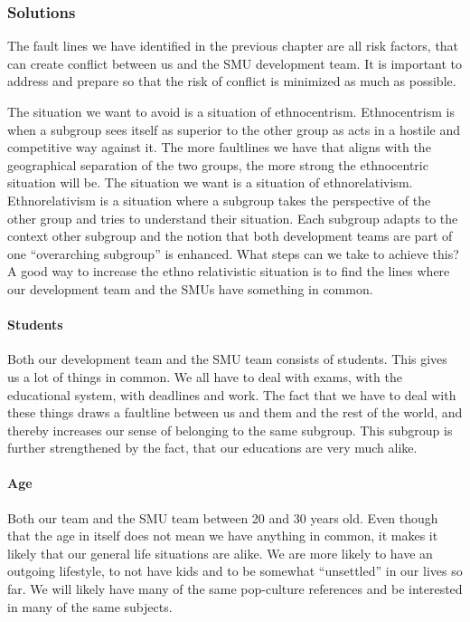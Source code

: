 \documentclass[a4paper,11pt,report]{article}
\begin{document}
{\subsubsection{Solutions}
The fault lines we have identified in the previous chapter are all risk factors, that can create conflict between us and the SMU development team. It is important to address and prepare so that the risk of conflict is minimized as much as possible.

The situation we want to avoid is a situation of ethnocentrism. Ethnocentrism is when a subgroup sees itself as superior to the other group as acts in a hostile and competitive way against it. The more faultlines we have that aligns with the geographical separation of the two groups, the more strong the ethnocentric situation will be. The situation we want is a situation of ethnorelativism\cite{smu}. Ethnorelativism is a situation where a subgroup takes the perspective of the other group and tries to understand their situation. Each subgroup adapts to the context other subgroup and the notion that both development teams are part of one “overarching subgroup” is enhanced. What steps can we take to achieve this?\\

A good way to increase the ethno relativistic situation is to find the lines where our development team and the SMUs have something in common. \\

\paragraph{Students}
Both our development team and the SMU team consists of students. This gives us a lot of things in common. We all have to deal with exams, with the educational system, with deadlines and work. The fact that we have to deal with these things draws a faultline between us and them and the rest of the world, and thereby increases our sense of belonging to the same subgroup. This subgroup is further strengthened by the fact, that our educations are very much alike. \\

\paragraph{Age}
Both our team and the SMU team between 20 and 30 years old. Even though that the age in itself does not mean we have anything in common, it makes it likely that our general life situations are alike. We are more likely to have an outgoing lifestyle, to not have kids and to be somewhat “unsettled” in our lives so far. We will likely have many of the same pop-culture references and be interested in many of the same subjects. 

}
\end{document}
